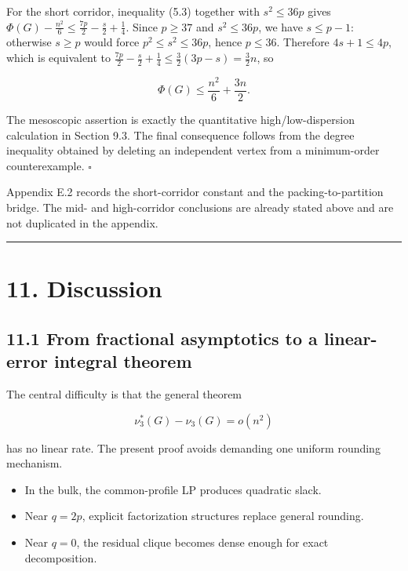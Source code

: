 \documentclass[english,11pt,a4paper]{article}
\providecommand{\tightlist}{\setlength{\itemsep}{0pt}\setlength{\parskip}{0pt}}
\begin{document}
For the short corridor, inequality (5.3) together with \(s^2\le36p\)
gives \(\Phi(G)-\tfrac{n^2}{6}\le\tfrac{7p}{2}-\tfrac{s}{2}+\tfrac14\).
Since \(p\ge37\) and \(s^2\le36p\), we have \(s\le p-1\): otherwise
\(s\ge p\) would force \(p^2\le s^2\le36p\), hence \(p\le36\). Therefore
\(4s+1\le4p\), which is equivalent to
\(\tfrac{7p}{2}-\tfrac{s}{2}+\tfrac14\le\tfrac32(3p-s)=\tfrac32 n\), so

\[
\Phi(G)\le\frac{n^2}{6}+\frac{3n}{2}.
\]

The mesoscopic assertion is exactly the quantitative high/low-dispersion
calculation in Section 9.3. The final consequence follows from the
degree inequality obtained by deleting an independent vertex from a
minimum-order counterexample. \(\square\)

Appendix E.2 records the short-corridor constant and the
packing-to-partition bridge. The mid- and high-corridor conclusions are
already stated above and are not duplicated in the appendix.

\begin{center}\rule{0.5\linewidth}{0.5pt}\end{center}

\section{11. Discussion}\label{discussion}

\subsection{11.1 From fractional asymptotics to a linear-error integral
theorem}\label{from-fractional-asymptotics-to-a-linear-error-integral-theorem}

The central difficulty is that the general theorem

\[
\nu_3^*(G)-\nu_3(G)=o(n^2)
\]

has no linear rate. The present proof avoids demanding one uniform
rounding mechanism.

\begin{itemize}
\tightlist
\item
  In the bulk, the common-profile LP produces quadratic slack.
\item
  Near \(q=2p\), explicit factorization structures replace general
  rounding.
\item
  Near \(q=0\), the residual clique becomes dense enough for exact
  decomposition.
\end{itemize}
\end{document}
